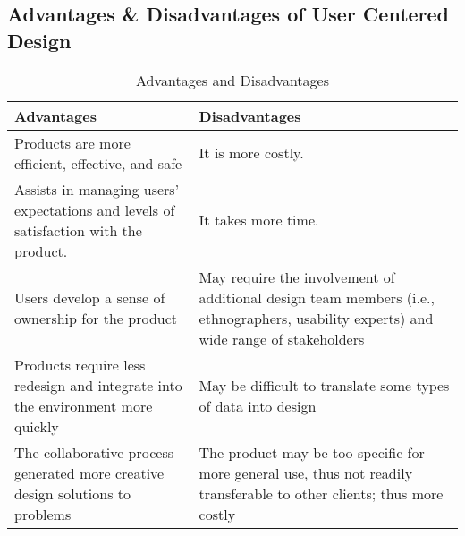\documentclass{article}
\begin{document}
\subsection{Advantages \& Disadvantages of User Centered Design}
    \begin{table}[H]
    \centering
    \begin{tabular}{|m{}|m{}|}
    \hline
    \textbf{Advantages} & \textbf{Disadvantages} \\
    \hline
    Products are more efficient, effective, and safe & It is more costly. \\
    \hline
    Assists in managing users’ expectations and levels of satisfaction with the product. & It takes more time. \\
    \hline
    Users develop a sense of ownership for the product & May require the involvement of additional design team members (i.e., ethnographers, usability experts) and wide range of stakeholders \\
    \hline
    Products require less redesign and integrate into the environment more quickly & May be difficult to translate some types of data into design \\
    \hline
    The collaborative process generated more creative design solutions to problems & The product may be too specific for more general use, thus not readily transferable to other clients; thus more costly \\
    \hline
    \end{tabular}
    \caption{Advantages and Disadvantages}
    \end{table}
\end{document}
